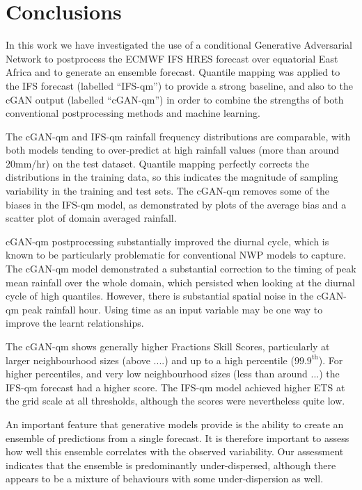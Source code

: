 \documentclass{article}
\begin{document}

\section{Conclusions}


In this work we have investigated the use of a conditional Generative Adversarial Network to postprocess the ECMWF IFS HRES forecast over equatorial East Africa and to generate an ensemble forecast. Quantile mapping was applied to the IFS forecast (labelled ``IFS-qm'') to provide a strong baseline, and also to the cGAN output (labelled ``cGAN-qm'') in order to combine the strengths of both conventional postprocessing methods and machine learning.


The cGAN-qm and IFS-qm rainfall frequency distributions are comparable, with both models tending to over-predict at high rainfall values (more than around 20mm/hr) on the test dataset. Quantile mapping perfectly corrects the distributions in the training data, so this indicates the magnitude of sampling variability in the training and test sets. The cGAN-qm removes some of the biases in the IFS-qm model, as demonstrated by plots of the average bias and a scatter plot of domain averaged rainfall.

cGAN-qm postprocessing substantially improved the diurnal cycle, which is known to be particularly problematic for conventional NWP models to capture. The cGAN-qm model demonstrated a substantial correction to the timing of peak mean rainfall over the whole domain, which persisted when looking at the diurnal cycle of high quantiles. However, there is substantial spatial noise in the cGAN-qm peak rainfall hour. Using time as an input variable may be one way to improve the learnt relationships.

The cGAN-qm shows generally higher Fractions Skill Scores, particularly at larger neighbourhood sizes (above ....) and up to a high percentile ($99.9^{\text{th}}$). For higher percentiles, and very low neighbourhood sizes (less than around ...) the IFS-qm forecast had a higher score. The IFS-qm model achieved higher ETS at the grid scale at all thresholds, although the scores were nevertheless quite low.

An important feature that generative models provide is the ability to create an ensemble of predictions from a single forecast. It is therefore important to assess how well this ensemble correlates with the observed variability. Our assessment indicates that the ensemble is predominantly under-dispersed, although there appears to be a mixture of behaviours with some under-dispersion as well.
\end{document}
